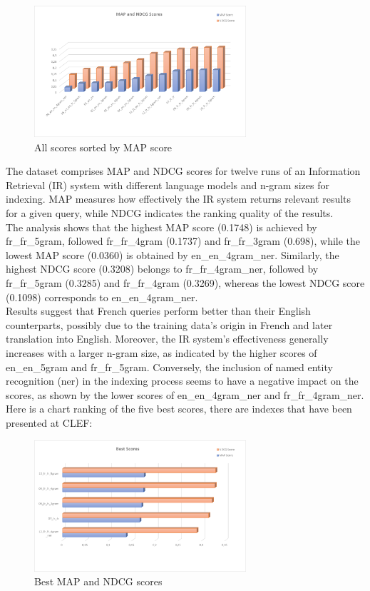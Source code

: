 \begin{figure}[h!]
	\centering
	\includegraphics[width=0.7\textwidth]{figure/allScores.png}
	\caption{All scores sorted by MAP score}
	\label{fig:sorted scores}
\end{figure}
The dataset comprises MAP and NDCG scores for twelve runs of an Information Retrieval (IR) system with different language models and n-gram sizes for indexing. MAP measures how effectively the IR system returns relevant results for a given query, while NDCG indicates the ranking quality of the results.\\
The analysis shows that the highest MAP score (0.1748) is achieved by fr\_fr\_5gram, followed fr\_fr\_4gram (0.1737) and fr\_fr\_3gram (0.698), while the lowest MAP score (0.0360) is obtained by en\_en\_4gram\_ner. Similarly, the highest NDCG score (0.3208) belongs to fr\_fr\_4gram\_ner, followed by fr\_fr\_5gram (0.3285) and fr\_fr\_4gram (0.3269), whereas the lowest NDCG score (0.1098) corresponds to en\_en\_4gram\_ner.\\
Results suggest that French queries perform better than their English counterparts, possibly due to the training data's origin in
French and later translation into English. Moreover, the IR system's effectiveness generally increases with a larger n-gram size, as indicated by the higher scores of en\_en\_5gram and fr\_fr\_5gram. Conversely, the inclusion of named entity recognition (ner) in the indexing process seems to have a negative impact on the scores, as shown by the lower scores of en\_en\_4gram\_ner and fr\_fr\_4gram\_ner.\\
Here is a chart ranking of the five best scores, there are indexes that have been presented at CLEF:
\begin{figure}[h!]
	\centering
	\includegraphics[width=0.7\textwidth]{figure/bestScores.png}
	\caption{Best MAP and NDCG scores}
	\label{fig:scores}
\end{figure}
